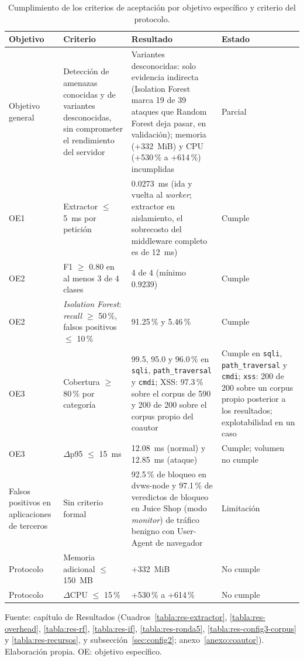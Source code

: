 \begin{table}[htbp]
\centering
\small
\setlength{\tabcolsep}{4pt}
\begin{tabular}{|p{2.2cm}|p{4.2cm}|p{4.8cm}|p{2.8cm}|}
\hline
\textbf{Objetivo} & \textbf{Criterio} & \textbf{Resultado} & \textbf{Estado} \\ \hline
Objetivo general & Detección de amenazas conocidas y de variantes desconocidas, sin comprometer el rendimiento del servidor & Variantes desconocidas: solo evidencia indirecta (Isolation Forest marca 19 de 39 ataques que Random Forest deja pasar, en validación); memoria (+332~MiB) y CPU (+530\,\% a +614\,\%) incumplidas & Parcial \\ \hline
OE1 & Extractor $\leq$ 5~ms por petición & 0.0273~ms (ida y vuelta al \textit{worker}; extractor en aislamiento, el sobrecosto del middleware completo es de 12~ms) & Cumple \\ \hline
OE2 & F1 $\geq$ 0.80 en al menos 3 de 4 clases & 4 de 4 (mínimo 0.9239) & Cumple \\ \hline
OE2 & \textit{Isolation Forest}: \textit{recall} $\geq$ 50\,\%, falsos positivos $\leq$ 10\,\% & 91.25\,\% y 5.46\,\% & Cumple \\ \hline
OE3 & Cobertura $\geq$ 80\,\% por categoría & 99.5, 95.0 y 96.0\,\% en \texttt{sqli}, \texttt{path\_traversal} y \texttt{cmdi}; XSS: 97.3\,\% sobre el corpus de 590 y 200 de 200 sobre el corpus propio del coautor & Cumple en \texttt{sqli}, \texttt{path\_traversal} y \texttt{cmdi}; \texttt{xss}: 200 de 200 sobre un corpus propio posterior a los resultados; explotabilidad en un caso \\ \hline
OE3 & $\Delta$p95 $\leq$ 15~ms & 12.08~ms (normal) y 12.85~ms (ataque) & Cumple; volumen no cumple \\ \hline
Falsos positivos en aplicaciones de terceros & Sin criterio formal & 92.5\,\% de bloqueo en dvws-node y 97.1\,\% de veredictos de bloqueo en Juice Shop (modo \textit{monitor}) de tráfico benigno con User-Agent de navegador & Limitación \\ \hline
Protocolo & Memoria adicional $\leq$ 150~MB & +332~MiB & No cumple \\ \hline
Protocolo & $\Delta$CPU $\leq$ 15\,\% & +530\,\% a +614\,\% & No cumple \\ \hline
\end{tabular}
\caption{Cumplimiento de los criterios de aceptación por objetivo específico y criterio del protocolo.}
\label{tabla:disc-cumplimiento}
\par\smallskip\footnotesize Fuente: capítulo de Resultados (Cuadros~\ref{tabla:res-extractor}, \ref{tabla:res-overhead}, \ref{tabla:res-rf}, \ref{tabla:res-if}, \ref{tabla:res-ronda5}, \ref{tabla:res-config3-corpus} y \ref{tabla:res-recursos}, y subsección~\ref{sec:config2}; anexo~\ref{anexo:coautor}). Elaboración propia. OE: objetivo específico.
\end{table}
